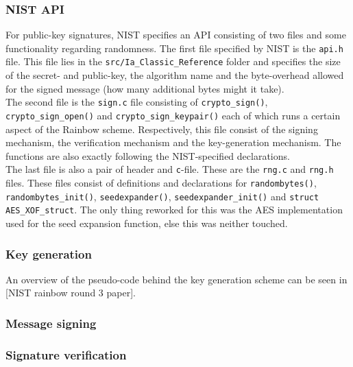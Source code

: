 \subsubsection{NIST API}
For public-key signatures, NIST specifies an API consisting of two files and some functionality regarding randomness. The first file specified by NIST is the \texttt{api.h} file. This file lies in the \texttt{src/Ia\_Classic\_Reference} folder and specifies the size of the secret- and public-key, the algorithm name and the byte-overhead allowed for the signed message (how many additional bytes might it take).
\medskip\\
The second file is the \texttt{sign.c} file consisting of \texttt{crypto\_sign()}, \texttt{crypto\_sign\_open()} and \texttt{crypto\_sign\_keypair()} each of which runs a certain aspect of the Rainbow scheme. Respectively, this file consist of the signing mechanism, the verification mechanism and the key-generation mechanism. The functions are also exactly following the NIST-specified declarations.
\medskip\\
The last file is also a pair of header and \texttt{c}-file. These are the \texttt{rng.c} and \texttt{rng.h} files. These files consist of definitions and declarations for \texttt{randombytes()}, \texttt{randombytes\_init()}, \texttt{seedexpander()}, \texttt{seedexpander\_init()} and \texttt{struct AES\_XOF\_struct}. The only thing reworked for this was the AES implementation used for the seed expansion function, else this was neither touched.
\subsubsection{Key generation}
An overview of the pseudo-code behind the key generation scheme can be seen in [NIST rainbow round 3 paper]. 
\subsubsection{Message signing}

\subsubsection{Signature verification}
